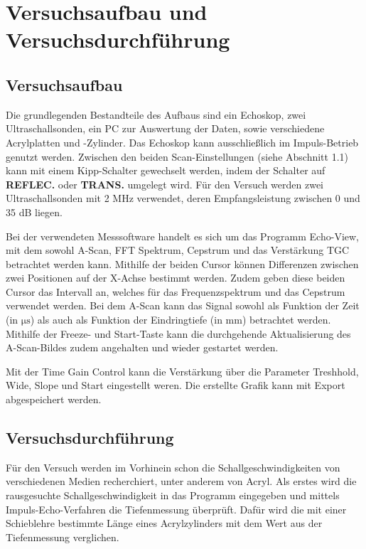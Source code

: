 \section{Versuchsaufbau und Versuchsdurchführung}

\subsection{Versuchsaufbau}

Die grundlegenden Bestandteile des Aufbaus sind ein Echoskop, zwei Ultraschallsonden,
ein PC zur Auswertung der Daten, sowie verschiedene Acrylplatten und -Zylinder.
Das Echoskop kann ausschließlich im Impuls-Betrieb genutzt werden. Zwischen den
beiden Scan-Einstellungen (siehe Abschnitt 1.1) kann mit einem Kipp-Schalter
gewechselt werden, indem der Schalter auf \textbf{REFLEC.} oder \textbf{TRANS.}
umgelegt wird. Für den Versuch werden zwei Ultraschallsonden mit 2 MHz verwendet,
deren Empfangsleistung zwischen 0 und 35 dB liegen.

Bei der verwendeten Messsoftware handelt es sich um das Programm Echo-View, mit
dem sowohl A-Scan, FFT Spektrum, Cepstrum und das Verstärkung TGC betrachtet
werden kann. Mithilfe der beiden Cursor können Differenzen zwischen zwei Positionen
auf der X-Achse bestimmt werden. Zudem geben diese beiden Cursor das Intervall
an, welches für das Frequenzspektrum und das Cepstrum verwendet werden.
Bei dem A-Scan kann das Signal sowohl als Funktion der Zeit (in $\si{\micro\second}$)
als auch als Funktion der Eindringtiefe (in mm) betrachtet werden. Mithilfe der
Freeze- und Start-Taste kann die durchgehende Aktualisierung des A-Scan-Bildes
zudem angehalten und wieder gestartet werden.

Mit der Time Gain Control kann die Verstärkung über die Parameter Treshhold, Wide,
Slope und Start eingestellt weren. Die erstellte Grafik kann mit Export abgespeichert
werden.


\subsection{Versuchsdurchführung}

Für den Versuch werden im Vorhinein schon die Schallgeschwindigkeiten von verschiedenen
Medien recherchiert, unter anderem von Acryl. Als erstes wird die rausgesuchte
Schallgeschwindigkeit in das Programm eingegeben und mittels
Impuls-Echo-Verfahren die Tiefenmessung überprüft.
Dafür wird die mit einer Schieblehre bestimmte Länge eines Acrylzylinders
mit dem Wert aus der Tiefenmessung verglichen.

